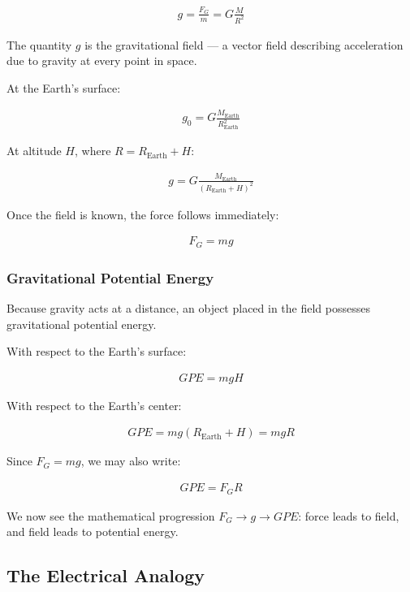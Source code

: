 \documentclass[12pt]{article}
\begin{document}
\begin{align*}
g = \frac{F_G}{m} = G \frac{M}{R^2}
\end{align*}

The quantity $g$ is the gravitational field — a vector field describing
acceleration due to gravity at every point in space.

At the Earth's surface:

\begin{align*}
g_0 = G \frac{M_{\text{Earth}}}{R_{\text{Earth}}^2}
\end{align*}

At altitude $H$, where $R = R_{\text{Earth}} + H$:

\begin{align*}
g = G \frac{M_{\text{Earth}}}{(R_{\text{Earth}} + H)^2}
\end{align*}

Once the field is known, the force follows immediately:

\begin{align*}
F_G = m g
\end{align*}

\subsubsection*{Gravitational Potential Energy}

Because gravity acts at a distance, an object placed in the field possesses
gravitational potential energy.

With respect to the Earth's surface:

\begin{align*}
GPE = m g H
\end{align*}

With respect to the Earth's center:

\begin{align*}
GPE = m g (R_{\text{Earth}} + H) = m g R
\end{align*}

Since $F_G = m g$, we may also write:

\begin{align*}
GPE = F_G R
\end{align*}

We now see the mathematical progression
$F_G \rightarrow g \rightarrow GPE$:
force leads to field, and field leads to potential energy.

\subsection*{The Electrical Analogy}
\end{document}

